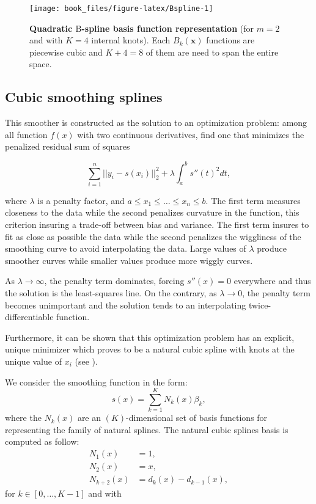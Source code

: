 \documentclass[]{book}
\begin{document}
\begin{figure}

{\centering \texttt{[image: book\_files/figure-latex/Bspline-1]} 

}

\caption{\textbf{Quadratic \(\mathrm{B}\)-spline basis function representation} (for \(m = 2\) and with \(K=4\) internal knots). Each \(B_k(\boldsymbol{x})\) functions are piecewise cubic and \(K+4 = 8\) of them are need to span the entire space.}\label{fig:Bspline}
\end{figure}

\hypertarget{smoothing}{%
\subsection{Cubic smoothing splines}\label{smoothing}}

This smoother is constructed as the solution to an optimization problem:
among all function \(f(x)\) with two continuous derivatives, find one that
minimizes the penalized residual sum of squares

\[\sum_{i=1}^n||y_i - s(x_i)||_2^2 + \lambda \int_a^b{s''(t)}^2dt,
  \label{eq:cubsmooth}\]

where \(\lambda\) is a penalty factor, and
\(a \leq x_1 \leq \dots \leq x_n \leq b\). The first term measures
closeness to the data while the second penalizes curvature in the
function, this criterion insuring a trade-off between bias and variance.
The first term insures to fit as close as possible the data while the
second penalizes the wiggliness of the smoothing curve to avoid
interpolating the data. Large values of \(\lambda\) produce smoother
curves while smaller values produce more wiggly curves.

As \(\lambda \rightarrow \infty\), the penalty term dominates, forcing
\(s''(x) = 0\) everywhere and thus the solution is the least-squares line.
On the contrary, as \(\lambda \rightarrow 0\), the penalty term becomes
unimportant and the solution tends to an interpolating
twice-differentiable function.

Furthermore, it can be shown that this optimization problem has an
explicit, unique minimizer which proves to be a natural cubic spline
with knots at the unique value of \(x_i\) (see \citep{reinsch_smoothing_1967}).

We consider the smoothing function in the form:
\[s(x) = \sum_{k=1}^{K} N_k(x) \beta_k,
\label{eq:smooth_fun}\] where the \(N_k(x)\) are an \((K)\)-dimensional set
of basis functions for representing the family of natural splines. The
natural cubic splines basis is computed as follow:
\[\begin{aligned}
N_1(x) &= 1,\\
N_2(x) & = x, \\
N_{k+2}(x) &= d_k(x) - d_{k-1}(x), \end{aligned}\]
for
\(k \in [0, \dots, K-1]\) and with
\end{document}

